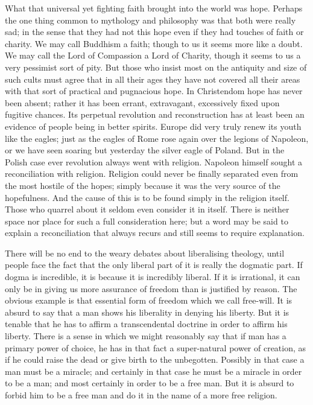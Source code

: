 What that universal yet fighting faith brought into the world was hope. Perhaps the one thing common to mythology and philosophy was that both were really sad; in the sense that they had not this hope even if they had touches of faith or charity. We may call Buddhism a faith; though to us it seems more like a doubt. We may call the Lord of Compassion a Lord of Charity, though it seems to us a very pessimist sort of pity. But those who insist most on the antiquity and size of such cults must agree that in all their ages they have not covered all their areas with that sort of practical and pugnacious hope. In Christendom hope has never been absent; rather it has been errant, extravagant, excessively fixed upon fugitive chances. Its perpetual revolution and reconstruction has at least been an evidence of people being in better spirits. Europe did very truly renew its youth like the eagles; just as the eagles of Rome rose again over the legions of Napoleon, or we have seen soaring but yesterday the silver eagle of Poland. But in the Polish case ever revolution always went with religion. Napoleon himself sought a reconciliation with religion. Religion could never be finally separated even from the most hostile of the hopes; simply because it was the very source of the hopefulness. And the cause of this is to be found simply in the religion itself. Those who quarrel about it seldom even consider it in itself. There is neither space nor place for such a full consideration here; but a word may be said to explain a reconciliation that always recurs and still seems to require explanation.

There will be no end to the weary debates about liberalising theology, until people face the fact that the only liberal part of it is really the dogmatic part. If dogma is incredible, it is because it is incredibly liberal. If it is irrational, it can only be in giving us more assurance of freedom than is justified by reason. The obvious example is that essential form of freedom which we call free-will. It is absurd to say that a man shows his liberality in denying his liberty. But it is tenable that he has to affirm a transcendental doctrine in order to affirm his liberty. There is a sense in which we might reasonably say that if man has a primary power of choice, he has in that fact a super-natural power of creation, as if he could raise the dead or give birth to the unbegotten. Possibly in that case a man must be a miracle; and certainly in that case he must be a miracle in order to be a man; and most certainly in order to be a free man. But it is absurd to forbid him to be a free man and do it in the name of a more free religion.

